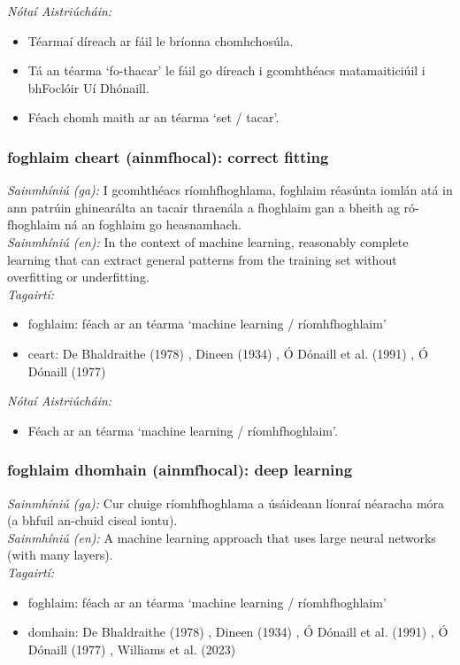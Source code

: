  \noindent \textit{Nótaí Aistriúcháin:}
\begin{itemize}
	\item Téarmaí díreach ar fáil le bríonna chomhchosúla.
	\item Tá an téarma `fo-thacar' le fáil go díreach i gcomhthéacs matamaiticiúil i bhFoclóir Uí Dhónaill.
	\item Féach chomh maith ar an téarma `set / tacar'.
\end{itemize}


\subsubsection*{foghlaim cheart (ainmfhocal): correct fitting}
 \noindent \textit{Sainmhíniú (ga):} I gcomhthéacs ríomhfhoghlama, foghlaim réasúnta iomlán atá in ann patrúin ghinearálta an tacair thraenála a fhoghlaim gan a bheith ag ró-fhoghlaim ná an foghlaim go heasnamhach.
\\
 \noindent \textit{Sainmhíniú (en):} In the context of machine learning, reasonably complete learning that can extract general patterns from the training set without overfitting or underfitting.
\\
 \noindent \textit{Tagairtí:}
\begin{itemize}
	\item foghlaim: féach ar an téarma `machine learning / ríomhfhoghlaim'
	\item ceart: De Bhaldraithe (1978) \cite{de-bhaldraithe}, Dineen (1934) \cite{dineen}, Ó Dónaill et al. (1991) \cite{focloir-beag}, Ó Dónaill (1977) \cite{odonaill}
\end{itemize}

 \noindent \textit{Nótaí Aistriúcháin:}
\begin{itemize}
	\item Féach ar an téarma `machine learning / ríomhfhoghlaim'.
\end{itemize}


\subsubsection*{foghlaim dhomhain (ainmfhocal): deep learning}
 \noindent \textit{Sainmhíniú (ga):} Cur chuige ríomhfhoghlama a úsáideann líonraí néaracha móra (a bhfuil an-chuid ciseal iontu).
\\
 \noindent \textit{Sainmhíniú (en):} A machine learning approach that uses large neural networks (with many layers).
\\
 \noindent \textit{Tagairtí:}
\begin{itemize}
	\item foghlaim: féach ar an téarma `machine learning / ríomhfhoghlaim'
	\item domhain: De Bhaldraithe (1978) \cite{de-bhaldraithe}, Dineen (1934) \cite{dineen}, Ó Dónaill et al. (1991) \cite{focloir-beag}, Ó Dónaill (1977) \cite{odonaill}, Williams et al. (2023) \cite{storchiste}
\end{itemize}

